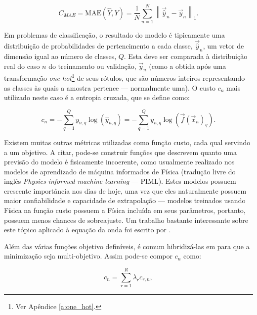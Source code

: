    \begin{equation} \label{e:c_mae_n}
      C_{MAE} =
      \text{MAE}\left(\hat{Y}, Y\right) =
      \frac{1}{N} \sum \limits_{n=1}^N \left\| \vec{\hat{y}}_n - \vec{y}_n \right\|_1
      .
    \end{equation}

    Em problemas de classificação, o resultado do modelo é tipicamente uma distribuição de probabilidades de pertencimento a cada classe, $\vec{\hat{y}}_n$, \DIFaddbegin {}\DIFaddend um vetor de dimensão igual ao número de classes, $Q$. Esta deve ser comparada à distribuição real do caso $n$ do treinamento ou validação, $\vec{y}_n$ (como a obtida após uma transformação \textit{one-hot}\footnote{Ver Apêndice \ref{a:one_hot}.} de seus rótulos, que são números inteiros representando as classes às quais a amostra pertence --- normalmente uma). O custo $c_n$ mais utilizado neste caso é a entropia cruzada, que se define como:

    \begin{equation} \label{e:c_xentropy_n}
      c_n = -\sum \limits_{q=1}^{Q} y_{n,q} \log({\hat{y}_{n,q}}) = -\sum \limits_{q=1}^{Q} y_{n,q} \log({\vec{f}(\vec{x}_n)_q})
      .
    \end{equation}

    Existem muitas outras métricas utilizadas como função custo, cada qual servindo a um objetivo. A citar, pode-se construir funções que descrevem quanto uma previsão do modelo é fisicamente incoerente, como usualmente realizado nos modelos de aprendizado de máquina informados de Física (tradução livre do inglês \textit{Physics-informed machine learning} --- PIML). Estes modelos possuem crescente importância nos dias de hoje, uma vez que eles naturalmente possuem maior confiabilidade e capacidade de extrapolação --- modelos treinados usando Física na função custo possuem a Física incluída em seus parâmetros, portanto, possuem menos chances de sobreajuste. Um trabalho bastante interessante sobre este tópico aplicado à equação da onda foi escrito por .

    Além das várias funções objetivo definíveis, é comum hibridizá-las em para que a minimização seja multi-objetivo. Assim pode-se compor $c_n$ como:

    \begin{equation} \label{e:c_hibrida_n}
      c_n = \sum \limits_{r=1}^{R} \lambda_r c_{r,n}
      ,
    \end{equation}

